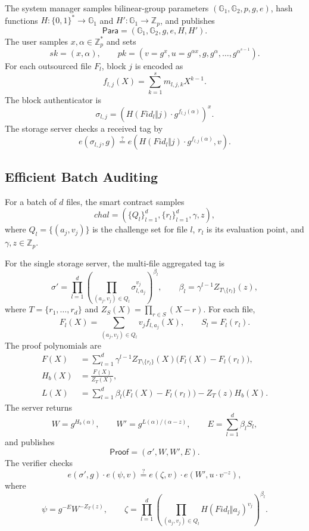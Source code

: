 \documentclass[11pt]{article}
\newcommand{\G}{\mathbb{G}}
\newcommand{\Zp}{\mathbb{Z}_p}
\begin{document}
The system manager samples bilinear-group parameters
\((\G_1,\G_2,p,g,e)\), hash functions \(H:\{0,1\}^\ast\to\G_1\) and
\(H':\G_1\to\Zp\), and publishes
\[
    \mathsf{Para}=(\G_1,\G_2,g,e,H,H').
\]
The user samples \(x,\alpha\in\Zp^\ast\) and sets
\[
    sk=(x,\alpha),\qquad
    pk=(v=g^x,u=g^{\alpha x},g,g^\alpha,\ldots,g^{\alpha^{s-1}}).
\]
For each outsourced file \(F_l\), block \(j\) is encoded as
\[
    f_{l,j}(X)=\sum_{k=1}^{s} m_{l,j,k}X^{k-1}.
\]
The block authenticator is
\[
    \sigma_{l,j}
    =
    \left(H(Fid_l\Vert j)\cdot g^{f_{l,j}(\alpha)}\right)^x .
\]
The storage server checks a received tag by
\[
    e(\sigma_{l,j},g)
    \stackrel{?}{=}
    e\!\left(H(Fid_l\Vert j)\cdot g^{f_{l,j}(\alpha)},v\right).
\]

\subsection{Efficient Batch Auditing}

For a batch of \(d\) files, the smart contract samples
\[
    chal=(\{Q_l\}_{l=1}^{d},\{r_l\}_{l=1}^{d},\gamma,z),
\]
where \(Q_l=\{(a_j,v_j)\}\) is the challenge set for file \(l\), \(r_l\) is its
evaluation point, and \(\gamma,z\in\Zp\).

For the single storage server, the multi-file aggregated tag is
\[
    \sigma'
    =
    \prod_{l=1}^{d}
    \left(
        \prod_{(a_j,v_j)\in Q_l}\sigma_{l,a_j}^{v_j}
    \right)^{\beta_l},
    \qquad
    \beta_l=\gamma^{l-1}Z_{T\setminus\{r_l\}}(z),
\]
where \(T=\{r_1,\ldots,r_d\}\) and \(Z_S(X)=\prod_{r\in S}(X-r)\).  For each
file,
\[
    F_l(X)=\sum_{(a_j,v_j)\in Q_l} v_j f_{l,a_j}(X),
    \qquad
    S_l=F_l(r_l).
\]
The proof polynomials are
\[
\begin{aligned}
    F(X)
    &=
    \sum_{l=1}^{d}\gamma^{l-1}Z_{T\setminus\{r_l\}}(X)
    \bigl(F_l(X)-F_l(r_l)\bigr),\\
    H_b(X)&=\frac{F(X)}{Z_T(X)},\\
    L(X)
    &=
    \sum_{l=1}^{d}\beta_l
    \bigl(F_l(X)-F_l(r_l)\bigr)
    -Z_T(z)H_b(X).
\end{aligned}
\]
The server returns
\[
    W=g^{H_b(\alpha)},\qquad
    W'=g^{L(\alpha)/(\alpha-z)},\qquad
    E=\sum_{l=1}^{d}\beta_l S_l,
\]
and publishes
\[
    \mathsf{Proof}=(\sigma',W,W',E).
\]
The verifier checks
\[
    e(\sigma',g)\cdot e(\psi,v)
    \stackrel{?}{=}
    e(\zeta,v)\cdot e(W',u\cdot v^{-z}),
\]
where
\[
    \psi=g^{-E}W^{-Z_T(z)},\qquad
    \zeta=
    \prod_{l=1}^{d}
    \left(
        \prod_{(a_j,v_j)\in Q_l}H(Fid_l\Vert a_j)^{v_j}
    \right)^{\beta_l}.
\]
\end{document}
